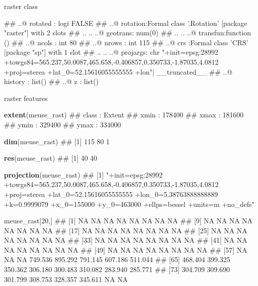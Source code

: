 \documentclass[11pt,ignorenonframetext,]{beamer}
\newenvironment{Shaded}{}{}
\newcommand{\KeywordTok}[1]{\textcolor[rgb]{0.00,0.44,0.13}{\textbf{#1}}}
\newcommand{\DecValTok}[1]{\textcolor[rgb]{0.25,0.63,0.44}{#1}}
\newcommand{\NormalTok}[1]{#1}
\let\oldShaded\Shaded
\let\endoldShaded\endShaded
\renewenvironment{Shaded}{\footnotesize\begin{spacing}{0.9}\oldShaded}{\endoldShaded\end{spacing}}
\let\oldverbatim\verbatim
\let\endoldverbatim\endverbatim
\newcommand{\scriptoutput}{
  \renewenvironment{Shaded}{\scriptsize\begin{spacing}{0.9}\oldShaded}{\endoldShaded\end{spacing}}
  \renewenvironment{verbatim}{\scriptsize\begin{spacing}{0.9}\oldverbatim}{\endoldverbatim\end{spacing}}
}
\begin{document}
\begin{frame}[fragile]{raster class}
\begin{Shaded}
\begin{Highlighting}[]
\NormalTok{##   ..@ rotated : logi FALSE}
\NormalTok{##   ..@ rotation:Formal class '.Rotation' [package "raster"] with 2 slots}
\NormalTok{##   .. .. ..@ geotrans: num(0) }
\NormalTok{##   .. .. ..@ transfun:function ()  }
\NormalTok{##   ..@ ncols   : int 80}
\NormalTok{##   ..@ nrows   : int 115}
\NormalTok{##   ..@ crs     :Formal class 'CRS' [package "sp"] with 1 slot}
\NormalTok{##   .. .. ..@ projargs: chr "+init=epsg:28992 +towgs84=565.237,50.0087,465.658,-0.406857,0.350733,-1.87035,4.0812 +proj=sterea +lat_0=52.15616055555555 +lon"| __truncated__}
\NormalTok{##   ..@ history : list()}
\NormalTok{##   ..@ z       : list()}
\end{Highlighting}
\end{Shaded}

\end{frame}

\begin{frame}[fragile,t]{raster features}

\scriptoutput

\begin{Shaded}
\begin{Highlighting}[]
\KeywordTok{extent}\NormalTok{(meuse_rast)}
\NormalTok{## class       : Extent }
\NormalTok{## xmin        : 178400 }
\NormalTok{## xmax        : 181600 }
\NormalTok{## ymin        : 329400 }
\NormalTok{## ymax        : 334000}

\KeywordTok{dim}\NormalTok{(meuse_rast)}
\NormalTok{## [1] 115  80   1}

\KeywordTok{res}\NormalTok{(meuse_rast)}
\NormalTok{## [1] 40 40}

\KeywordTok{projection}\NormalTok{(meuse_rast)}
\NormalTok{## [1] "+init=epsg:28992 +towgs84=565.237,50.0087,465.658,-0.406857,0.350733,-1.87035,4.0812 +proj=sterea +lat_0=52.15616055555555 +lon_0=5.38763888888889 +k=0.9999079 +x_0=155000 +y_0=463000 +ellps=bessel +units=m +no_defs"}

\NormalTok{meuse_rast[}\DecValTok{20}\NormalTok{,]}
\NormalTok{##  [1]      NA      NA      NA      NA      NA      NA      NA      NA}
\NormalTok{##  [9]      NA      NA      NA      NA      NA      NA      NA      NA}
\NormalTok{## [17]      NA      NA      NA      NA      NA      NA      NA      NA}
\NormalTok{## [25]      NA      NA      NA      NA      NA      NA      NA      NA}
\NormalTok{## [33]      NA      NA      NA      NA      NA      NA      NA      NA}
\NormalTok{## [41]      NA      NA      NA      NA      NA      NA      NA      NA}
\NormalTok{## [49]      NA      NA      NA      NA      NA      NA      NA      NA}
\NormalTok{## [57]      NA      NA      NA 749.536 895.292 791.145 607.186 511.044}
\NormalTok{## [65] 468.404 399.325 350.362 306.180 300.483 310.082 283.940 285.771}
\NormalTok{## [73] 304.709 309.690 301.799 308.753 328.357 345.611      NA      NA}
\end{Highlighting}
\end{Shaded}

\end{frame}
\end{document}
